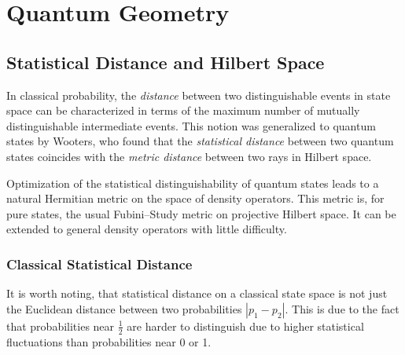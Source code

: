\chapter{Quantum Geometry}
\label{chap:quantumGeometry}

\section{Statistical Distance and Hilbert Space}
\label{sec:statisticalDistance}
%


In classical probability, the \emph{distance} between two distinguishable 
events in state space can be characterized in terms of the maximum number
of mutually distinguishable intermediate events.  This notion was 
generalized to quantum states by Wooters\cite{Wooters:81}, who found
that the \emph{statistical distance} between two quantum states coincides with
the \emph{metric distance} between two rays in Hilbert space.

Optimization of the statistical distinguishability of quantum
states leads to a natural Hermitian metric on the space of density
operators\cite{Braunstein/Caves:94}.  This metric is, for pure states,
the usual Fubini--Study metric on projective Hilbert space\cite{Gibbons:92}.
It can be extended to general density operators with little difficulty.

\subsection{Classical Statistical Distance}


It is worth noting, that statistical distance on a classical state space 
is not just the Euclidean distance between two probabilities $|p_1-p_2|$.  
This is due to the fact that probabilities near $\frac{1}{2}$ are harder 
to distinguish due to higher statistical fluctuations than probabilities 
near 0 or 1.

